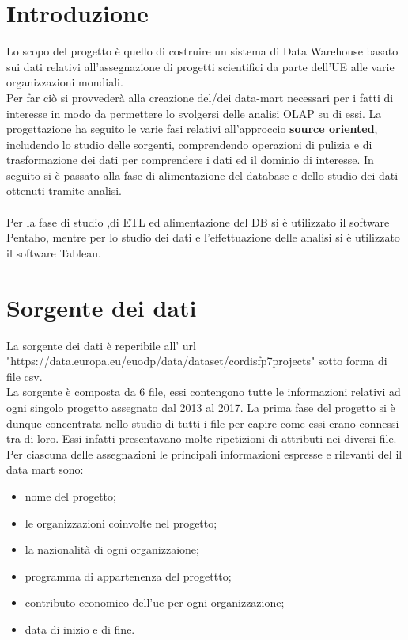\documentclass[12pt,a4paper]{report}
\begin{document}
	\begin{titlepage}
		
	\end{titlepage}
\section*{Introduzione}
Lo scopo del progetto è quello di costruire un sistema di Data Warehouse basato sui dati relativi all'assegnazione di progetti scientifici da parte dell'UE alle varie organizzazioni mondiali.\\\noindent
Per far ciò si provvederà alla creazione del/dei data-mart necessari per i fatti di interesse in modo da permettere lo svolgersi delle analisi OLAP su di essi.
La progettazione ha seguito le varie fasi relativi all'approccio \textbf{source oriented}, includendo lo studio delle sorgenti, comprendendo operazioni di pulizia e di trasformazione dei dati per comprendere i dati ed il dominio di interesse. In seguito si è passato alla fase di alimentazione del database e dello studio dei dati ottenuti tramite analisi.\\\\\noindent
Per la fase di studio ,di ETL ed alimentazione del DB si è utilizzato il software Pentaho, mentre per lo studio dei dati e l'effettuazione delle analisi si è utilizzato il software Tableau.
\section*{Sorgente dei dati}
La sorgente dei dati è reperibile all' url  "https://data.europa.eu/euodp/data/dataset/cordisfp7projects" sotto forma di file csv.\\\noindent
La sorgente è composta da 6 file, essi contengono tutte le informazioni relativi ad ogni singolo progetto assegnato dal 2013 al 2017. La prima fase del progetto si è dunque concentrata nello studio di tutti i file per capire come essi erano connessi tra di loro. Essi infatti presentavano molte ripetizioni di attributi nei diversi file.
Per ciascuna delle assegnazioni le principali informazioni espresse e rilevanti del il data mart sono:
\begin{itemize}
	\item nome del progetto;
	\item le organizzazioni coinvolte nel progetto;
	\item la nazionalità di ogni organizzaione;
	\item programma di appartenenza del progettto;
	\item contributo economico dell'ue per ogni organizzazione;
	\item data di inizio e di fine.
\end{itemize}
\end{document}
